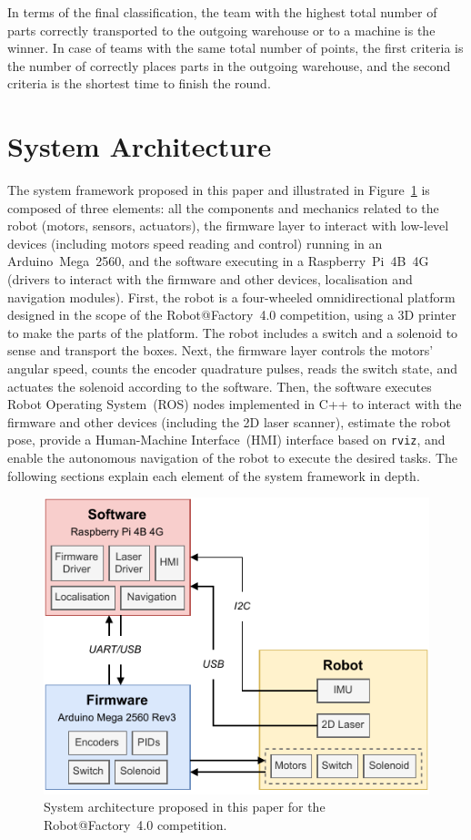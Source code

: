 \documentclass[conference]{IEEEtran}
\begin{document}
In terms of the final classification, the team with the highest total number of parts correctly transported to the outgoing warehouse or to a machine is the winner.
In case of teams with the same total number of points, the first criteria is the number of correctly places parts in the outgoing warehouse, and the second criteria is the shortest time to finish the round.





\section{System Architecture}\label{sec:system}

The system framework proposed in this paper and illustrated in Figure~\ref{fig:system-architecture} is composed of three elements: all the components and mechanics related to the robot (motors, sensors, actuators), the firmware layer to interact with low-level devices (including motors speed reading and control) running in an Arduino~Mega~2560, and the software executing in a Raspberry~Pi~4B~4G (drivers to interact with the firmware and other devices, localisation and navigation modules).
First, the robot is a four-wheeled omnidirectional platform designed in the scope of the Robot@Factory~4.0 competition, using a 3D printer to make the parts of the platform. The robot includes a switch and a solenoid to sense and transport the boxes.
Next, the firmware layer controls the motors' angular speed, counts the encoder quadrature pulses, reads the switch state, and actuates the solenoid according to the software.
Then, the software executes Robot Operating System~(ROS) nodes implemented in C++ to interact with the firmware and other devices (including the 2D laser scanner), estimate the robot pose, provide a Human-Machine Interface~(HMI) interface based on \texttt{rviz}, and enable the autonomous navigation of the robot to execute the desired tasks.
The following sections explain each element of the system framework in depth.

\begin{figure}[!t]
\centering
\centerline{\includegraphics[width=0.8\columnwidth]{figures/system-architecture.pdf}}
\caption{System architecture proposed in this paper for the Robot@Factory~4.0 competition.}
\label{fig:system-architecture}
\end{figure}
\end{document}
